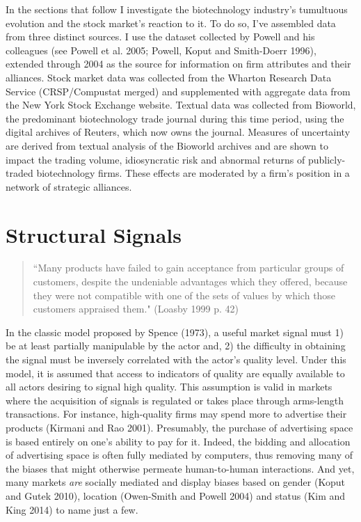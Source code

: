 In the sections that follow I investigate the biotechnology industry's tumultuous evolution and the stock market's reaction to it. To do so, I've assembled data from three distinct sources. I use the dataset collected by Powell and his colleagues (see Powell et al. 2005; Powell, Koput and Smith-Doerr 1996), extended through 2004 as the source for information on firm attributes and their alliances. Stock market data was collected from the Wharton Research Data Service (CRSP/Compustat merged) and supplemented with aggregate data from the New York Stock Exchange website. Textual data was collected from Bioworld, the predominant biotechnology trade journal during this time period, using the digital archives of Reuters, which now owns the journal. Measures of uncertainty are derived from textual analysis of the Bioworld archives and are shown to impact the trading volume, idiosyncratic risk and abnormal returns of publicly-traded biotechnology firms. These effects are moderated by a firm's position in a network of strategic alliances.

\section{Structural Signals}
\begin{small}
\begin{quote}
``Many products have failed to gain acceptance from particular groups of customers, despite the undeniable advantages which they offered, because they were not compatible with one of the sets of values by which those customers appraised them." (Loasby 1999 p. 42) 
\end{quote}
\end{small}

In the classic model proposed by Spence (1973), a useful market signal must 1) be at least partially manipulable by the actor and, 2) the difficulty in obtaining the signal must be inversely correlated with the actor's quality level. Under this model, it is assumed that access to indicators of quality are equally available to all actors desiring to signal high quality. This assumption is valid in markets where the acquisition of signals is regulated or takes place through arms-length transactions. For instance, high-quality firms may spend more to advertise their products (Kirmani and Rao 2001). Presumably, the purchase of advertising space is based entirely on one's ability to pay for it. Indeed, the bidding and allocation of advertising space is often fully mediated by computers, thus removing many of the biases that might otherwise permeate human-to-human interactions. And yet, many markets {\it are} socially mediated and display biases based on gender (Koput and Gutek 2010), location (Owen-Smith and Powell 2004) and status (Kim and King 2014) to name just a few. 

